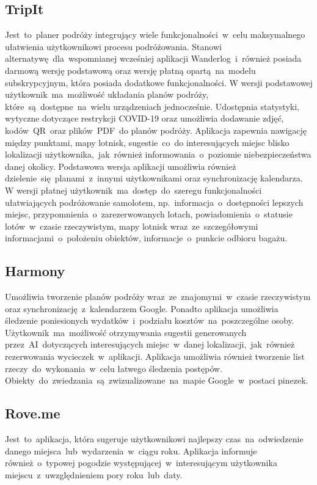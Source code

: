 \subsection{TripIt}
\label{subsec:tripit}
Jest~to~planer podróży integrujący wiele funkcjonalności~w~celu maksymalnego ułatwienia użytkownikowi procesu podróżowania.
Stanowi alternatywę~dla~wspomnianej wcześniej aplikacji Wanderlog~i~również posiada darmową wersję podstawową oraz wersję płatną opartą~na~modelu subskrypcyjnym, która posiada dodatkowe funkcjonalności.
W wersji podstawowej użytkownik~ma~możliwość układania planów podróży, które~są~dostępne~na~wielu urządzeniach jednocześnie.
Udostępnia statystyki, wytyczne dotyczące restrykcji COVID-19 oraz umożliwia dodawanie zdjęć, kodów~QR~oraz plików~PDF~do planów podróży.
Aplikacja zapewnia nawigację między punktami, mapy lotnisk, sugestie~co~do interesujących miejsc blisko lokalizacji użytkownika,~jak~również informowania~o~poziomie niebezpieczeństwa danej okolicy.
Podstawowa wersja aplikacji umożliwia również dzielenie~się~planami~z~innymi użytkownikami oraz synchronizację kalendarza.
W wersji płatnej użytkownik~ma~dostęp~do~szeregu funkcjonalności ułatwiających podróżowanie samolotem, np.~informacja~o~dostępności lepszych miejsc, przypomnienia~o~zarezerwowanych lotach, powiadomienia~o~statusie lotów~w~czasie rzeczywistym, mapy lotnisk wraz~ze~szczegółowymi informacjami~o~położeniu obiektów, informacje~o~punkcie odbioru bagażu.

\subsection{Harmony}
\label{subsec:harmony}
Umożliwia tworzenie planów podróży wraz~ze~znajomymi~w~czasie rzeczywistym oraz synchronizację~z~kalendarzem Google.
Ponadto aplikacja umożliwia śledzenie poniesionych wydatków~i~podziału kosztów~na~poszczególne osoby.
Użytkownik~ma~możliwość otrzymywania sugestii generowanych przez~AI~dotyczących interesujących miejsc~w~danej lokalizacji,~jak~również rezerwowania wycieczek~w~aplikacji.
Aplikacja umożliwia również tworzenie list rzeczy~do~wykonania~w~celu łatwego śledzenia postępów.
Obiekty~do~zwiedzania~są~zwizualizowane~na~mapie Google~w~postaci pinezek.

\subsection{Rove.me}
\label{subsec:rove.me}
Jest~to~aplikacja, która sugeruje użytkownikowi najlepszy czas~na~odwiedzenie danego miejsca~lub~wydarzenia~w~ciągu roku.
Aplikacja informuje również~o~typowej pogodzie występującej~w~interesującym użytkownika miejscu~z~uwzględnieniem pory roku~lub~daty.

